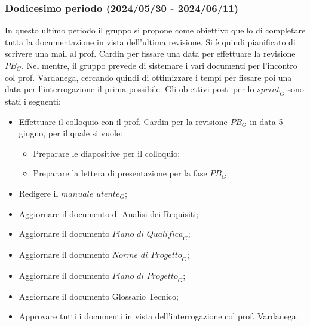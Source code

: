 \subsubsection{Dodicesimo periodo (2024/05/30 - 2024/06/11)}
In questo ultimo periodo il gruppo si propone come obiettivo quello di completare tutta la documentazione in vista dell'ultima revisione. Si è quindi pianificato di scrivere una mail al prof. Cardin per fissare una data per effettuare la revisione $\textit{PB}_G$. Nel mentre, il gruppo prevede di sistemare i vari documenti per l'incontro col prof. Vardanega, cercando quindi di ottimizzare i tempi per fissare poi una data per l'interrogazione il prima possibile.
Gli obiettivi posti per lo $\textit{sprint}_G$ sono stati i seguenti:
\begin{itemize}
    \item Effettuare il colloquio con il prof. Cardin per la revisione $\textit{PB}_G$ in data 5 giugno, per il quale si vuole:
    \begin{itemize}
        \item Preparare le diapositive per il colloquio;
        \item Preparare la lettera di presentazione per la fase $\textit{PB}_G$.
    \end{itemize}
    \item Redigere il $\textit{manuale utente}_G$;
    \item Aggiornare il documento di Analisi dei Requisiti;
    \item Aggiornare il documento $\textit{Piano di Qualifica}_G$;
    \item Aggiornare il documento $\textit{Norme di Progetto}_G$;
    \item Aggiornare il documento $\textit{Piano di Progetto}_G$;
    \item Aggiornare il documento Glossario Tecnico;
    \item Approvare tutti i documenti in vista dell'interrogazione col prof. Vardanega.
\end{itemize}
